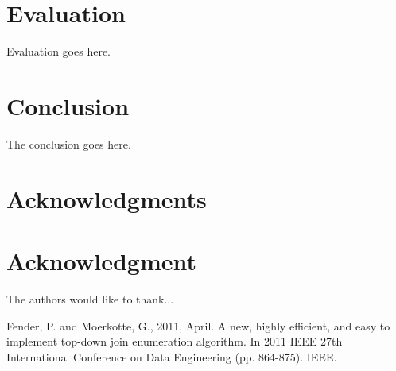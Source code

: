 \documentclass[10pt,journal,compsoc]{IEEEtran}
\begin{document}
\section{Evaluation}
Evaluation goes here.

\section{Conclusion}
The conclusion goes here.



\ifCLASSOPTIONcompsoc
  \section*{Acknowledgments}
\else
  \section*{Acknowledgment}
\fi


The authors would like to thank...

\ifCLASSOPTIONcaptionsoff
  \newpage
\fi


\begin{thebibliography}{1}

Fender, P. and Moerkotte, G., 2011, April. A new, highly efficient, and easy to implement top-down join enumeration algorithm. In 2011 IEEE 27th International Conference on Data Engineering (pp. 864-875). IEEE.

\end{thebibliography}
\end{document}
